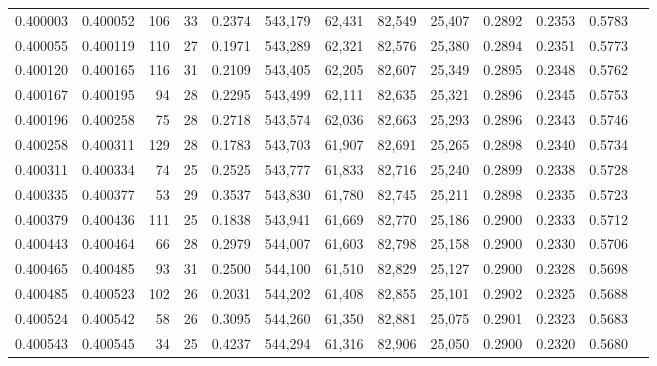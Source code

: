 \begin{tabular}{rrrrrrrrrrrrr}
0.400003 & 0.400052 &   106 &  33 &                                     0.2374 & 543,179 &  62,431 &  82,549 &  25,407 & 0.2892 & 0.2353 & 0.5783 \\
0.400055 & 0.400119 &   110 &  27 &                                     0.1971 & 543,289 &  62,321 &  82,576 &  25,380 & 0.2894 & 0.2351 & 0.5773 \\
0.400120 & 0.400165 &   116 &  31 &                                     0.2109 & 543,405 &  62,205 &  82,607 &  25,349 & 0.2895 & 0.2348 & 0.5762 \\
0.400167 & 0.400195 &    94 &  28 &                                     0.2295 & 543,499 &  62,111 &  82,635 &  25,321 & 0.2896 & 0.2345 & 0.5753 \\
0.400196 & 0.400258 &    75 &  28 &                                     0.2718 & 543,574 &  62,036 &  82,663 &  25,293 & 0.2896 & 0.2343 & 0.5746 \\
0.400258 & 0.400311 &   129 &  28 &                                     0.1783 & 543,703 &  61,907 &  82,691 &  25,265 & 0.2898 & 0.2340 & 0.5734 \\
0.400311 & 0.400334 &    74 &  25 &                                     0.2525 & 543,777 &  61,833 &  82,716 &  25,240 & 0.2899 & 0.2338 & 0.5728 \\
0.400335 & 0.400377 &    53 &  29 &                                     0.3537 & 543,830 &  61,780 &  82,745 &  25,211 & 0.2898 & 0.2335 & 0.5723 \\
0.400379 & 0.400436 &   111 &  25 &                                     0.1838 & 543,941 &  61,669 &  82,770 &  25,186 & 0.2900 & 0.2333 & 0.5712 \\
0.400443 & 0.400464 &    66 &  28 &                                     0.2979 & 544,007 &  61,603 &  82,798 &  25,158 & 0.2900 & 0.2330 & 0.5706 \\
0.400465 & 0.400485 &    93 &  31 &                                     0.2500 & 544,100 &  61,510 &  82,829 &  25,127 & 0.2900 & 0.2328 & 0.5698 \\
0.400485 & 0.400523 &   102 &  26 &                                     0.2031 & 544,202 &  61,408 &  82,855 &  25,101 & 0.2902 & 0.2325 & 0.5688 \\
0.400524 & 0.400542 &    58 &  26 &                                     0.3095 & 544,260 &  61,350 &  82,881 &  25,075 & 0.2901 & 0.2323 & 0.5683 \\
0.400543 & 0.400545 &    34 &  25 &                                     0.4237 & 544,294 &  61,316 &  82,906 &  25,050 & 0.2900 & 0.2320 & 0.5680 \\

\end{tabular}
